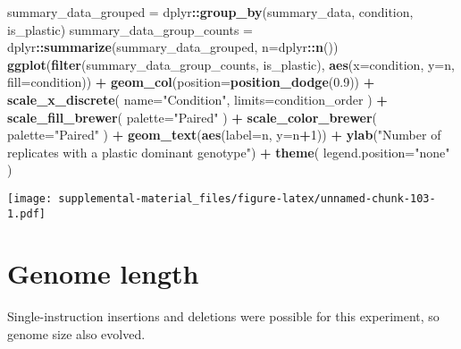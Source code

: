 \documentclass[]{book}
\newenvironment{Shaded}{\begin{snugshade}}{\end{snugshade}}
\newcommand{\DataTypeTok}[1]{\textcolor[rgb]{0.13,0.29,0.53}{#1}}
\newcommand{\DecValTok}[1]{\textcolor[rgb]{0.00,0.00,0.81}{#1}}
\newcommand{\FloatTok}[1]{\textcolor[rgb]{0.00,0.00,0.81}{#1}}
\newcommand{\KeywordTok}[1]{\textcolor[rgb]{0.13,0.29,0.53}{\textbf{#1}}}
\newcommand{\NormalTok}[1]{#1}
\newcommand{\OperatorTok}[1]{\textcolor[rgb]{0.81,0.36,0.00}{\textbf{#1}}}
\newcommand{\StringTok}[1]{\textcolor[rgb]{0.31,0.60,0.02}{#1}}
\begin{document}
\begin{Shaded}
\begin{Highlighting}[]
\NormalTok{summary_data_grouped =}\StringTok{ }\NormalTok{dplyr}\OperatorTok{::}\KeywordTok{group_by}\NormalTok{(summary_data, condition, is_plastic)}
\NormalTok{summary_data_group_counts =}\StringTok{ }\NormalTok{dplyr}\OperatorTok{::}\KeywordTok{summarize}\NormalTok{(summary_data_grouped, }\DataTypeTok{n=}\NormalTok{dplyr}\OperatorTok{::}\KeywordTok{n}\NormalTok{())}
\KeywordTok{ggplot}\NormalTok{(}\KeywordTok{filter}\NormalTok{(summary_data_group_counts, is_plastic), }\KeywordTok{aes}\NormalTok{(}\DataTypeTok{x=}\NormalTok{condition, }\DataTypeTok{y=}\NormalTok{n, }\DataTypeTok{fill=}\NormalTok{condition)) }\OperatorTok{+}
\StringTok{  }\KeywordTok{geom_col}\NormalTok{(}\DataTypeTok{position=}\KeywordTok{position_dodge}\NormalTok{(}\FloatTok{0.9}\NormalTok{)) }\OperatorTok{+}
\StringTok{  }\KeywordTok{scale_x_discrete}\NormalTok{(}
    \DataTypeTok{name=}\StringTok{"Condition"}\NormalTok{,}
    \DataTypeTok{limits=}\NormalTok{condition_order}
\NormalTok{  ) }\OperatorTok{+}
\StringTok{  }\KeywordTok{scale_fill_brewer}\NormalTok{(}
    \DataTypeTok{palette=}\StringTok{"Paired"}
\NormalTok{  ) }\OperatorTok{+}
\StringTok{  }\KeywordTok{scale_color_brewer}\NormalTok{(}
    \DataTypeTok{palette=}\StringTok{"Paired"}
\NormalTok{  ) }\OperatorTok{+}
\StringTok{  }\KeywordTok{geom_text}\NormalTok{(}\KeywordTok{aes}\NormalTok{(}\DataTypeTok{label=}\NormalTok{n, }\DataTypeTok{y=}\NormalTok{n}\OperatorTok{+}\DecValTok{1}\NormalTok{)) }\OperatorTok{+}
\StringTok{  }\KeywordTok{ylab}\NormalTok{(}\StringTok{"Number of replicates with a plastic dominant genotype"}\NormalTok{) }\OperatorTok{+}
\StringTok{  }\KeywordTok{theme}\NormalTok{(}
    \DataTypeTok{legend.position=}\StringTok{"none"}
\NormalTok{  )}
\end{Highlighting}
\end{Shaded}

\texttt{[image: supplemental-material\_files/figure-latex/unnamed-chunk-103-1.pdf]}

\hypertarget{genome-length}{%
\section{Genome length}\label{genome-length}}

Single-instruction insertions and deletions were possible for this experiment, so genome size also evolved.
\end{document}
